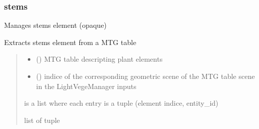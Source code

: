 \documentclass[letterpaper,10pt,english]{sphinxmanual}
\begin{document}
\subsubsection{stems}
\label{\detokenize{reference:stems}}
\sphinxAtStartPar
Manages stems element (opaque)

\begin{fulllineitems}
\label{\detokenize{reference:stems.extract_stems_from_MTG}}
\pysigstartsignatures
{}
\pysigstopsignatures
\sphinxAtStartPar
Extracts stems element from a MTG table
\begin{quote}\begin{description}
\begin{itemize}
\item {} 
\sphinxAtStartPar
{} () \textendash{} MTG table descripting plant elements

\item {} 
\sphinxAtStartPar
{} () \textendash{} indice of the corresponding geometric scene of the MTG table scene in the LightVegeManager inputs

\end{itemize}

\sphinxAtStartPar
{} is a list where each entry is a tuple (element indice, entity\_id)

\sphinxAtStartPar
list of tuple

\end{description}\end{quote}

\end{fulllineitems}

\end{document}
